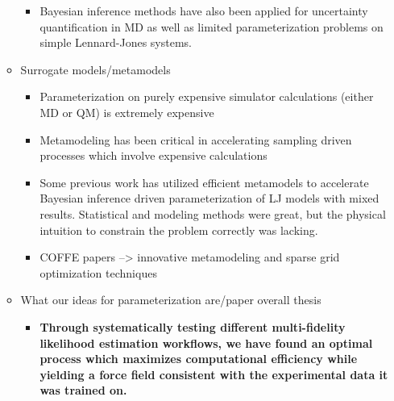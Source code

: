 \documentclass[aps,pre,nofootinbib,superscriptaddress,linenumbers,10pt, draft,tightenlines]{revtex4-1}
\begin{document}
\begin{itemize}
\begin{itemize}
\begin{itemize}
    		      \cite{bayes1,bayes2,bayes3,bayes5,bayes6,bayes7,bayes8,bayes_coarse} 
    		\item Bayesian inference methods have also been applied for uncertainty 
                  quantification in MD as well as limited parameterization
    		      problems on simple Lennard-Jones systems. \cite{bayes4,UQMDrizzi,LJexpBayes}
    	\end{itemize}
        \item Surrogate models/metamodels
        \begin{itemize}
            \item Parameterization on purely expensive simulator calculations (either MD or QM)
                  is extremely expensive
        	\item Metamodeling has been critical in accelerating sampling driven processes 
                  which involve expensive calculations \cite{mbar}
        	\item Some previous work has utilized efficient metamodels to accelerate Bayesian
                  inference driven parameterization of LJ models with mixed results. Statistical
                  and modeling methods were great, but the physical intuition to constrain the 
                  problem correctly was lacking. \cite{LJexpBayes}
    	    \item COFFE papers --> innovative metamodeling and sparse grid optimization 
                  techniques \cite{COFFE2016}    	    
        \end{itemize}    
        \item What our ideas for parameterization are/paper overall thesis
        \begin{itemize}
        	\item \textbf{Through systematically testing different multi-fidelity likelihood
                  estimation workflows, we have found an optimal process which 
        	      maximizes computational efficiency while yielding a force field consistent 
                  with the experimental data it was trained on.} %

\end{itemize}
\end{itemize}
\end{itemize}
\end{document}
